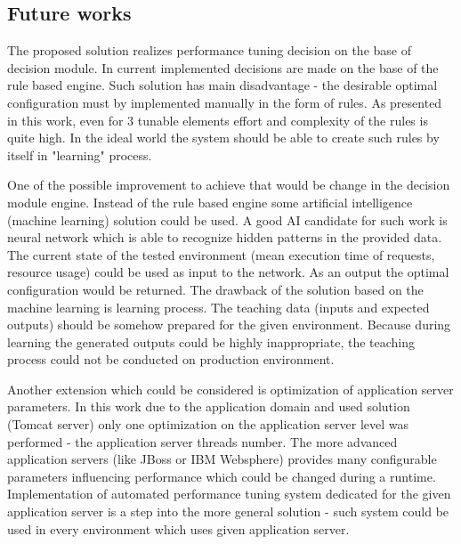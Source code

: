 \documentclass[12pt,a4paper]{article}
\begin{document}
\subsection{Future works}

The proposed solution realizes performance tuning decision on the base of decision module. In current implemented decisions are made on the base of the rule based engine. Such solution has main disadvantage - the desirable optimal configuration must by implemented manually in the form of rules. As presented in this work, even for 3 tunable elements effort and complexity of the rules is quite high. In the ideal world the system should be able to create such rules by itself in "learning" process. 

One of the possible improvement to achieve that would be change in the decision module engine. Instead of the rule based engine some artificial intelligence (machine learning) solution could be used. A good AI candidate for such work is neural network which is able to recognize hidden patterns in the provided data. The current state of the tested environment (mean execution time of requests, resource usage) could be used as input to the network. As an output the optimal configuration would be returned. The drawback of the solution based on the machine learning is learning process. The teaching data (inputs and expected outputs) should be somehow prepared for the given environment. Because during learning the generated outputs could be highly inappropriate, the teaching process could not be conducted on production environment.

Another extension which could be considered is optimization of application server parameters. In this work due to the application domain and used solution (Tomcat server) only one optimization on the application server level was performed - the application server threads number. The more advanced application servers (like JBoss or IBM Websphere) provides many configurable parameters influencing performance which could be changed during a runtime. Implementation of automated performance tuning system dedicated for the given application server is a step into the more general solution - such system could be used in every environment which uses given application server.  

\pagebreak
\clearpage
\end{document}
